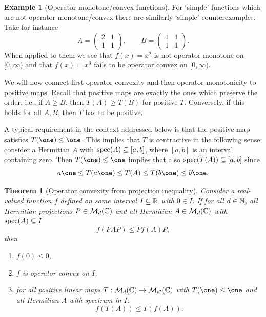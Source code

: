 \documentclass[11pt,a4paper]{article}
\theoremstyle{plain}
\newtheorem{theorem}{Theorem}[section]
\theoremstyle{definition}
\newtheorem{example}{Example}[section]
\theoremstyle{remark}
\numberwithin{equation}{section}
\begin{document}
\begin{example}[Operator monotone/convex functions]
    For `simple' functions which are not operator monotone/convex there are similarly
    `simple' counterexamples. Take for instance
    \begin{equation}\label{eq:5.20}
        A=
        \begin{pmatrix}
            2 &1\\
            1 &1
        \end{pmatrix},
        \qquad
        B=
        \begin{pmatrix}
            1 &1\\
            1 &1
        \end{pmatrix}.
    \end{equation}
    When applied to them we see that $f(x)=x^2$ is not operator monotone on $[0,\infty)$
    and that $f(x)=x^3$ fails to be operator convex on $[0,\infty)$.
\end{example}

We will now connect first operator convexity and then operator monotonicity to
positive maps. Recall that positive maps are exactly the ones which preserve the
order, i.e., if $A\ge B$, then $T(A)\ge T(B)$ for positive $T$. Conversely, if this
holds for all $A,B$, then $T$ has to be positive.

A typical requirement in the context addressed below is that the positive map
satisfies $T(\one)\le \one$. This implies that $T$ is contractive in the following
sense: consider a Hermitian $A$ with $\operatorname{spec}(A)\subseteq [a,b]$, where $[a,b]$ is an
interval containing zero. Then $T(\one)\le \one$ implies that also
$\operatorname{spec}(T(A))\subseteq [a,b]$ since
\begin{equation}\label{eq:5.21}
    a\one \le T(a\one) \le T(A) \le T(b\one) \le b\one.
\end{equation}

\begin{theorem}[Operator convexity from projection inequality]
    Consider a real-valued function $f$ defined on some interval $I\subseteq \mathbb{R}$ with
    $0\in I$. If for all $d\in \mathbb{N}$, all Hermitian projections $P\in \mathcal{M}_d(\mathbb{C})$ and all
    Hermitian $A\in \mathcal{M}_d(\mathbb{C})$ with $\operatorname{spec}(A)\subseteq I$
    \begin{equation}\label{eq:5.22}
        f(PAP) \le P f(A)P,
    \end{equation}
    then
    \begin{enumerate}
        \item $f(0)\le 0$,
        \item $f$ is operator convex on $I$,
        \item for all positive linear maps $T:\mathcal{M}_d(\mathbb{C})\to \mathcal{M}_{d'}(\mathbb{C})$ with
              $T(\one)\le \one$ and all Hermitian $A$ with spectrum in $I$:
              \begin{equation}\label{eq:5.23}
                  f(T(A)) \le T(f(A)).
              \end{equation}
    \end{enumerate}
\end{theorem}
\end{document}

